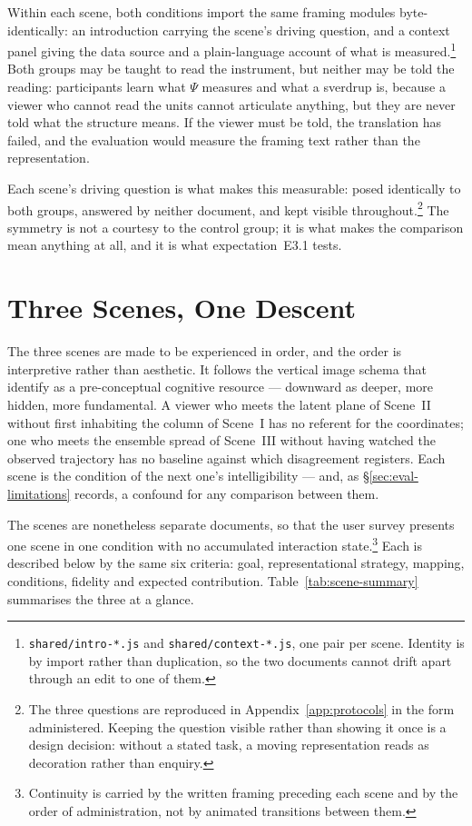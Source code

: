 Within each scene, both conditions import the same framing modules byte-identically: an introduction carrying the scene's driving question, and a context panel giving the data source and a plain-language account of what is measured.\footnote{\texttt{shared/intro-*.js} and \texttt{shared/context-*.js}, one pair per scene. Identity is by import rather than duplication, so the two documents cannot drift apart through an edit to one of them.} Both groups may be taught to read the instrument, but neither may be told the reading: participants learn what $\Psi$ measures and what a sverdrup is, because a viewer who cannot read the units cannot articulate anything, but they are never told what the structure means. If the viewer must be told, the translation has failed, and the evaluation would measure the framing text rather than the representation.

Each scene's driving question is what makes this measurable: posed identically to both groups, answered by neither document, and kept visible throughout.\footnote{The three questions are reproduced in Appendix~\ref{app:protocols} in the form administered. Keeping the question visible rather than showing it once is a design decision: without a stated task, a moving representation reads as decoration rather than enquiry.} The symmetry is not a courtesy to the control group; it is what makes the comparison mean anything at all, and it is what expectation~E3.1 tests.

\section{Three Scenes, One Descent}
\label{sec:three-scenes}

The three scenes are made to be experienced in order, and the order is interpretive rather than aesthetic. It follows the vertical image schema that \citet{lakoff1999} identify as a pre-conceptual cognitive resource --- downward as deeper, more hidden, more fundamental. A viewer who meets the latent plane of Scene~II without first inhabiting the column of Scene~I has no referent for the coordinates; one who meets the ensemble spread of Scene~III without having watched the observed trajectory has no baseline against which disagreement registers. Each scene is the condition of the next one's intelligibility --- and, as \S\ref{sec:eval-limitations} records, a confound for any comparison between them.

The scenes are nonetheless separate documents, so that the user survey presents one scene in one condition with no accumulated interaction state.\footnote{Continuity is carried by the written framing preceding each scene and by the order of administration, not by animated transitions between them.} Each is described below by the same six criteria: goal, representational strategy, mapping, conditions, fidelity and expected contribution. Table~\ref{tab:scene-summary} summarises the three at a glance.

